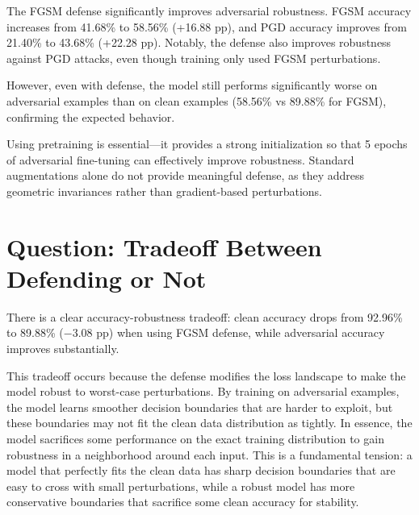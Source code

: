 \documentclass[11pt]{article}
\begin{document}
The FGSM defense significantly improves adversarial robustness. FGSM accuracy increases from 41.68\% to 58.56\% (+16.88 pp), and PGD accuracy improves from 21.40\% to 43.68\% (+22.28 pp). Notably, the defense also improves robustness against PGD attacks, even though training only used FGSM perturbations.

However, even with defense, the model still performs significantly worse on adversarial examples than on clean examples (58.56\% vs 89.88\% for FGSM), confirming the expected behavior.

Using pretraining is essential---it provides a strong initialization so that 5 epochs of adversarial fine-tuning can effectively improve robustness. Standard augmentations alone do not provide meaningful defense, as they address geometric invariances rather than gradient-based perturbations.

\section{Question: Tradeoff Between Defending or Not}

There is a clear accuracy-robustness tradeoff: clean accuracy drops from 92.96\% to 89.88\% (−3.08 pp) when using FGSM defense, while adversarial accuracy improves substantially.

This tradeoff occurs because the defense modifies the loss landscape to make the model robust to worst-case perturbations. By training on adversarial examples, the model learns smoother decision boundaries that are harder to exploit, but these boundaries may not fit the clean data distribution as tightly. In essence, the model sacrifices some performance on the exact training distribution to gain robustness in a neighborhood around each input. This is a fundamental tension: a model that perfectly fits the clean data has sharp decision boundaries that are easy to cross with small perturbations, while a robust model has more conservative boundaries that sacrifice some clean accuracy for stability.
\end{document}
